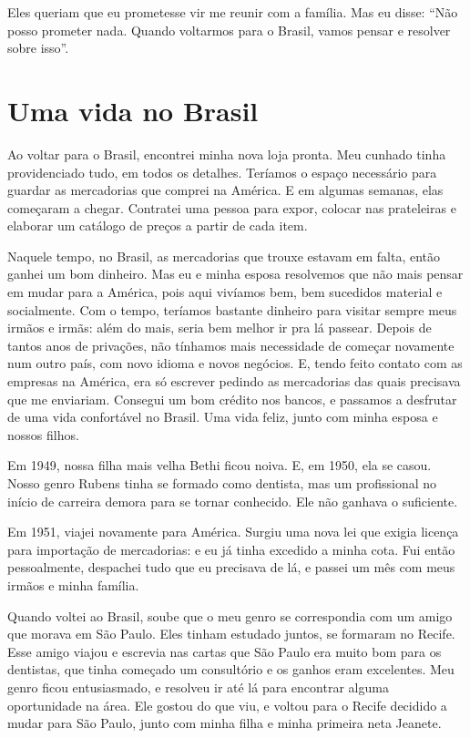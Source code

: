 Eles queriam que eu prometesse vir me reunir
com a família. Mas eu disse: ``Não posso prometer nada. Quando 
voltarmos para o Brasil, vamos pensar e resolver sobre isso''.

\chapter{Uma vida no Brasil}

Ao voltar para o Brasil, encontrei minha nova loja pronta. Meu
cunhado tinha providenciado tudo, em todos os detalhes. Teríamos
o espaço necessário para guardar as mercadorias que comprei na América. 
E em algumas semanas, elas começaram a chegar. Contratei
uma pessoa para expor, colocar nas
prateleiras e elaborar um catálogo de preços a partir de cada item.

Naquele tempo, no Brasil, as mercadorias que trouxe estavam em falta, 
então ganhei um bom dinheiro. Mas eu e minha
esposa resolvemos que não mais pensar em mudar para a América, pois 
aqui vivíamos bem, bem sucedidos material e socialmente. Com o tempo, 
teríamos bastante dinheiro para visitar sempre meus irmãos e irmãs: além do mais, 
seria bem melhor ir pra lá passear. Depois de tantos anos de privações, não
tínhamos mais necessidade de começar novamente num outro país, com 
novo idioma e novos negócios. E, tendo feito contato com as empresas na América, 
era só escrever pedindo as mercadorias das quais precisava que me
enviariam. Consegui um bom crédito nos bancos, e passamos a desfrutar de
uma vida confortável no Brasil. Uma vida feliz, junto com minha
esposa e nossos filhos.

Em 1949, nossa filha mais velha Bethi ficou noiva. E, em 1950, ela se
casou. Nosso genro Rubens tinha se formado como dentista, mas um
profissional no início de carreira demora para se tornar conhecido. Ele não ganhava o suficiente.

Em 1951, viajei novamente para América. Surgiu uma
nova lei que exigia licença para importação de mercadorias: e eu já tinha excedido a minha cota. Fui então pessoalmente, despachei tudo que eu precisava de lá, e passei um mês com meus irmãos e minha família.

Quando voltei ao Brasil, soube que o meu genro se correspondia 
com um amigo que morava em São Paulo. Eles tinham estudado
juntos, se formaram no Recife. Esse amigo viajou e escrevia nas cartas
que São Paulo era muito bom para os dentistas, que tinha começado um
consultório e os ganhos eram excelentes. Meu genro ficou
entusiasmado, e resolveu ir até lá para encontrar alguma oportunidade na área. Ele gostou do que viu, e voltou para o Recife decidido a mudar para São Paulo, junto com minha filha e
minha primeira neta Jeanete.

